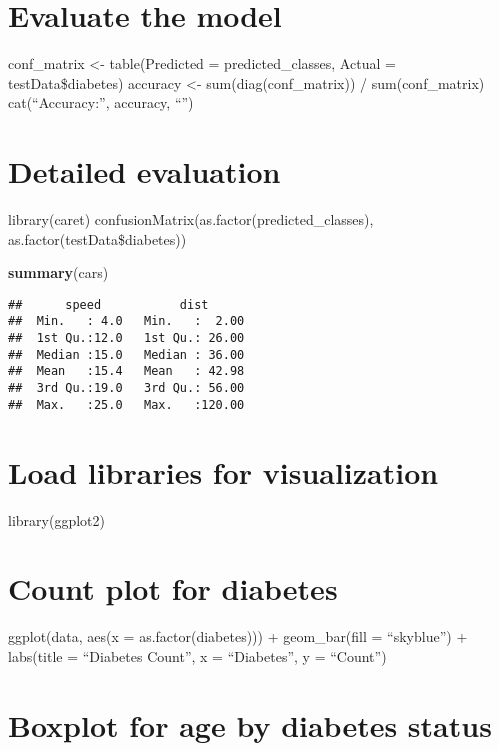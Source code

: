 \documentclass[
]{article}
\newenvironment{Shaded}{\begin{snugshade}}{\end{snugshade}}
\newcommand{\FunctionTok}[1]{\textcolor[rgb]{0.13,0.29,0.53}{\textbf{#1}}}
\newcommand{\NormalTok}[1]{#1}
\begin{document}
\hypertarget{evaluate-the-model}{%
\section{Evaluate the model}\label{evaluate-the-model}}

conf\_matrix \textless- table(Predicted = predicted\_classes, Actual =
testData\$diabetes) accuracy \textless- sum(diag(conf\_matrix)) /
sum(conf\_matrix) cat(``Accuracy:'', accuracy, ``\n'')

\hypertarget{detailed-evaluation}{%
\section{Detailed evaluation}\label{detailed-evaluation}}

library(caret) confusionMatrix(as.factor(predicted\_classes),
as.factor(testData\$diabetes))

\begin{Shaded}
\begin{Highlighting}[]
\FunctionTok{summary}\NormalTok{(cars)}
\end{Highlighting}
\end{Shaded}

\begin{verbatim}
##      speed           dist       
##  Min.   : 4.0   Min.   :  2.00  
##  1st Qu.:12.0   1st Qu.: 26.00  
##  Median :15.0   Median : 36.00  
##  Mean   :15.4   Mean   : 42.98  
##  3rd Qu.:19.0   3rd Qu.: 56.00  
##  Max.   :25.0   Max.   :120.00
\end{verbatim}

\hypertarget{load-libraries-for-visualization-1}{%
\section{Load libraries for
visualization}\label{load-libraries-for-visualization-1}}

library(ggplot2)

\hypertarget{count-plot-for-diabetes-1}{%
\section{Count plot for diabetes}\label{count-plot-for-diabetes-1}}

ggplot(data, aes(x = as.factor(diabetes))) + geom\_bar(fill =
``skyblue'') + labs(title = ``Diabetes Count'', x = ``Diabetes'', y =
``Count'')

\hypertarget{boxplot-for-age-by-diabetes-status-1}{%
\section{Boxplot for age by diabetes
status}\label{boxplot-for-age-by-diabetes-status-1}}
\end{document}
